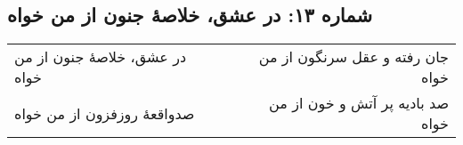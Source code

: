 \begin{center}
\section*{شماره ۱۳: در عشق، خلاصۀ جنون از من خواه}
\label{sec:013}
\begin{longtable}{l p{0.5cm} r}
در عشق، خلاصهٔ جنون از من خواه
&&
جان رفته و عقل سرنگون از من خواه
\\
صدواقعهٔ روزفزون از من خواه
&&
صد بادیه پر آتش و خون از من خواه
\\
\end{longtable}
\end{center}
